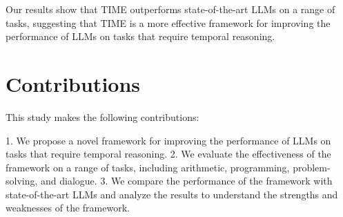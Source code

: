 \documentclass[11pt]{article}
\begin{document}
Our results show that TIME outperforms state-of-the-art LLMs on a range of tasks, suggesting that TIME is a more effective framework for improving the performance of LLMs on tasks that require temporal reasoning.

\section{Contributions}

This study makes the following contributions:

1. We propose a novel framework for improving the performance of LLMs on tasks that require temporal reasoning.
2. We evaluate the effectiveness of the framework on a range of tasks, including arithmetic, programming, problem-solving, and dialogue.
3. We compare the performance of the framework with state-of-the-art LLMs and analyze the results to understand the strengths and weaknesses of the framework.
\end{document}
